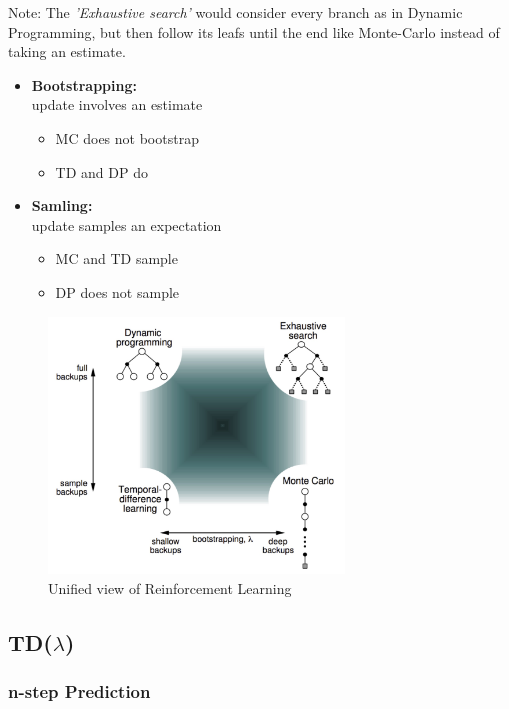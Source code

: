 \documentclass[10pt]{article}
\begin{document}
\begin{center}
\begin{minipage}[t]{0.45\textwidth}
Note: The \textit{'Exhaustive search'} would consider every branch as in Dynamic Programming, but then follow its leafs until the end like Monte-Carlo instead of taking an estimate.
\end{minipage} \hfill
\begin{minipage}[t]{0.4\textwidth}
\begin{itemize}
\item \textbf{Bootstrapping:} \\ update involves an estimate
\begin{itemize}
\item MC does not bootstrap
\item TD and DP do
\end{itemize}
\item \textbf{Samling:} \\ update samples an expectation
\begin{itemize}
\item MC and TD sample
\item DP does not sample
\end{itemize}
\end{itemize}
\end{minipage}
\end{center}
\newpage
\begin{figure}
\includegraphics[width=0.7\textwidth]{pictures/unified_view.jpg}
\caption{Unified view of Reinforcement Learning}
\end{figure}

\subsection{TD($\lambda$)}
\subsubsection*{n-step Prediction}
\end{document}
